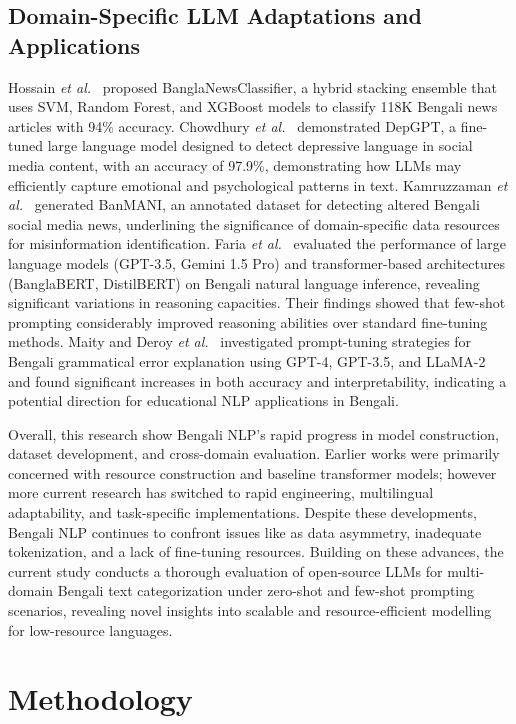 \documentclass[10pt,letterpaper]{article}
\begin{document}
\subsection*{Domain-Specific LLM Adaptations and Applications}

Hossain \textit{et al.}~\cite{b26} proposed BanglaNewsClassifier, a hybrid stacking ensemble that uses SVM, Random Forest, and XGBoost models to classify 118K Bengali news articles with 94\% accuracy. Chowdhury \textit{et al.}~\cite{b27} demonstrated DepGPT, a fine-tuned large language model designed to detect depressive language in social media content, with an accuracy of 97.9\%, demonstrating how LLMs may efficiently capture emotional and psychological patterns in text. Kamruzzaman \textit{et al.}~\cite{b28} generated BanMANI, an annotated dataset for detecting altered Bengali social media news, underlining the significance of domain-specific data resources for misinformation identification. Faria \textit{et al.}~\cite{b29} evaluated the performance of large language models (GPT-3.5, Gemini 1.5 Pro) and transformer-based architectures (BanglaBERT, DistilBERT) on Bengali natural language inference, revealing significant variations in reasoning capacities. Their findings showed that few-shot prompting considerably improved reasoning abilities over standard fine-tuning methods. Maity and Deroy \textit{et al.}~\cite{b30} investigated prompt-tuning strategies for Bengali grammatical error explanation using GPT-4, GPT-3.5, and LLaMA-2 and found significant increases in both accuracy and interpretability, indicating a potential direction for educational NLP applications in Bengali.

\noindent Overall, this research show Bengali NLP's rapid progress in model construction, dataset development, and cross-domain evaluation. Earlier works were primarily concerned with resource construction and baseline transformer models; however more current research has switched to rapid engineering, multilingual adaptability, and task-specific implementations. Despite these developments, Bengali NLP continues to confront issues like as data asymmetry, inadequate tokenization, and a lack of fine-tuning resources. Building on these advances, the current study conducts a thorough evaluation of open-source LLMs for multi-domain Bengali text categorization under zero-shot and few-shot prompting scenarios, revealing novel insights into scalable and resource-efficient modelling for low-resource languages.

\section*{Methodology}
\label{sec:methodology}
\end{document}
